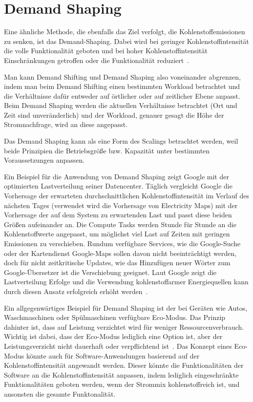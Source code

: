 \section{Demand Shaping}
Eine ähnliche Methode, die ebenfalls das Ziel verfolgt, die Kohlenstoffemissionen zu senken, ist das Demand-Shaping.
Dabei wird bei geringer Kohlenstoffintensität die volle Funktionalität geboten und bei hoher Kohlenstoffintensität Einschränkungen getroffen oder die Funktionalität reduziert~\cite{Currie.2024}.

Man kann Demand Shifting und Demand Shaping also voneinander abgrenzen, indem man beim Demand Shifting einen bestimmten Workload betrachtet und die Verhältnisse dafür entweder auf örtlicher oder auf zeitlicher Ebene anpasst.
Beim Demand Shaping werden die aktuellen Verhältnisse betrachtet (Ort und Zeit sind unveränderlich) und der Workload, genauer gesagt die Höhe der Stromnachfrage, wird an diese angepasst.

Das Demand Shaping kann als eine Form des Scalings betrachtet werden, weil beide Prinzipien die Betriebsgröße bzw. Kapazität unter bestimmten Voraussetzungen anpassen.

Ein Beispiel für die Anwendung von Demand Shaping zeigt Google mit der optimierten Lastverteilung seiner Datencenter.
Täglich vergleicht Google die Vorhersage der erwarteten durchschnittlichen Kohlenstoffintensität im Verlauf des nächsten Tages (verwendet wird die Vorhersage von Electricity Maps) mit der Vorhersage der auf dem System zu erwartenden Last und passt diese beiden Größen aufeinander an.
Die Compute Tasks werden Stunde für Stunde an die Kohlenstoffwerte angepasst, um möglichst viel Last auf Zeiten mit geringen Emissionen zu verschieben.
Rundum verfügbare Services, wie die Google-Suche oder der Kartendienst Google-Maps sollen davon nicht beeinträchtigt werden, doch für nicht zeitkritische Updates, wie das Hinzufügen neuer Wörter zum Google-Übersetzer ist die Verschiebung geeignet.
Laut Google zeigt die Lastverteilung Erfolge und die Verwendung kohlenstoffarmer Energiequellen kann durch diesen Ansatz erfolgreich erhöht werden~\cite{Radovanovic.22.4.2020}.

Ein allgegenwärtiges Beispiel für Demand Shaping ist der bei Geräten wie Autos, Waschmaschinen oder Spülmaschinen verfügbare Eco-Modus.
Das Prinzip dahinter ist, dass auf Leistung verzichtet wird für weniger Ressourcenverbrauch.
Wichtig ist dabei, dass der Eco-Modus lediglich eine Option ist, aber der Leistungsverzicht nicht dauerhaft oder verpflichtend ist~\cite{GreenSoftwareFoundation.2022}.
Das Konzept eines Eco-Modus könnte auch für Software-Anwendungen basierend auf der Kohlenstoffintensität angewandt werden.
Dieser könnte die Funktionalitäten der Software an die Kohlenstoffintensität anpassen, indem lediglich eingeschränkte Funktionalitäten geboten werden, wenn der Strommix \glqq kohlenstoffreich\grqq{} ist, und ansonsten die gesamte Funktonalität.

